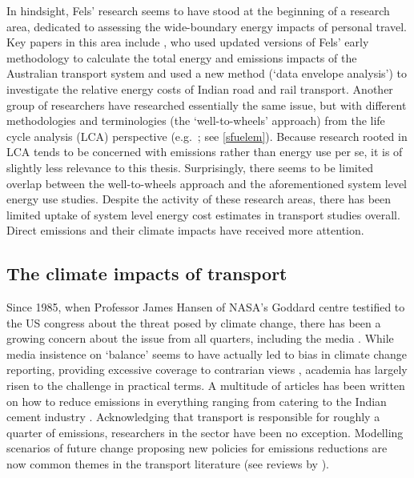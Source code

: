 In hindsight, Fels' research seems to have stood at the beginning of a
research area, dedicated to assessing the wide-boundary energy impacts of
personal travel. Key papers in this area include \citet{Lenzen1999}, who used
updated versions of Fels' early methodology to calculate the total energy and
emissions impacts of the Australian transport system and  \citet{Ramanathan2000}
used a new method (`data envelope analysis') to investigate
the relative energy costs of Indian road and rail transport.
Another group of researchers have researched essentially the same
issue, but with different methodologies and terminologies
(the `well-to-wheels' approach) from the
life cycle analysis (LCA) perspective (e.g.~\citealp{wang2002fuel};
see \cref{sfuelem}).
Because research rooted in LCA tends to be
concerned with emissions rather than energy use per se, it is
of slightly less relevance to this thesis.
Surprisingly, there seems to be
limited overlap between the well-to-wheels approach and the aforementioned
system level energy use studies.
Despite the activity of these research areas, 
there has been limited uptake of system level energy
cost estimates in transport studies overall. Direct emissions and
their climate impacts have received more attention.

\subsection{The climate impacts of transport}
Since 1985, when Professor James Hansen of NASA's Goddard centre testified
to the US congress about the threat posed by climate change, there has
been a growing concern about the issue from all quarters, including the media
\citep{Boykoff2007}. While media insistence on `balance' seems to have actually
led to bias in climate change reporting, providing excessive coverage to contrarian
views \citep{boykoff2004balance}, academia has largely risen to
the challenge in practical terms. A multitude of articles has been written on how to
reduce emissions in everything ranging from catering \citep{gossling2011food}
to the Indian cement industry \citep{kumar2010environmental}.
Acknowledging that transport is responsible for roughly a quarter of emissions,
researchers in the sector have been no exception.
Modelling scenarios of future change proposing new policies
for emissions reductions are now common themes in the transport literature
(see reviews by \citealp{Chapman2007} \citealp{ross2010analysis}).

